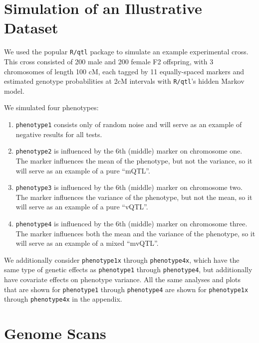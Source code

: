 \documentclass{article}
\begin{document}
\section*{Simulation of an Illustrative Dataset}

We used the popular \texttt{R/qtl} package to simulate an example experimental cross.
This cross consisted of 200 male and 200 female F2 offspring, with 3 chromosomes of length 100 cM, each tagged by 11 equally-spaced markers and estimated genotype probabilities at 2cM intervals with \texttt{R/qtl}'s hidden Markov model.

We simulated four phenotypes:

\begin{enumerate}
	\item \texttt{phenotype1} consists only of random noise and will serve as an example of negative results for all tests.
	\item \texttt{phenotype2} is influenced by the 6th (middle) marker on chromosome one.  The marker influences the mean of the phenotype, but not the variance, so it will serve as an example of a pure ``mQTL''.
	\item \texttt{phenotype3} is influenced by the 6th (middle) marker on chromosome two.  The marker influences the variance of the phenotype, but not the mean, so it will serve as an example of a pure ``vQTL''.
	\item \texttt{phenotype4} is influenced by the 6th (middle) marker on chromosome three.  The marker influences both the mean and the variance of the phenotype, so it will serve as an example of a mixed ``mvQTL''.
\end{enumerate}

We additionally consider \texttt{phenotype1x} through \texttt{phenotype4x}, which have the same type of genetic effects as \texttt{phenotype1} through \texttt{phenotype4}, but additionally have covariate effects on phenotype variance.
All the same analyses and plots that are shown for \texttt{phenotype1} through \texttt{phenotype4} are shown for \texttt{phenotype1x} through \texttt{phenotype4x} in the appendix.




\section*{Genome Scans}
\end{document}
